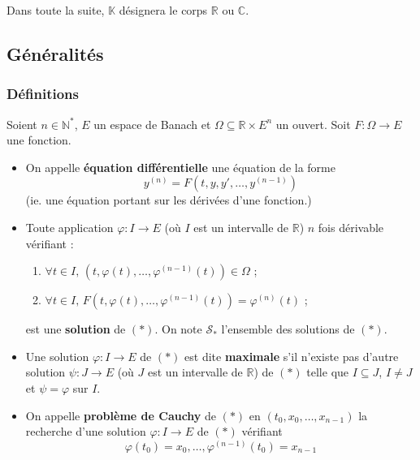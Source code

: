 




  Dans toute la suite, $\mathbb{K}$ désignera le corps $\mathbb{R}$ ou $\mathbb{C}$.

  \subsection{Généralités}

  \subsubsection{Définitions}


  \begin{definition}
    Soient $n \in \mathbb{N}^*$, $E$ un espace de Banach et $\Omega \subseteq \mathbb{R} \times E^n$ un ouvert. Soit $F : \Omega \rightarrow E$ une fonction.
    \begin{itemize}
      \item On appelle \textbf{équation différentielle} une équation de la forme
      \[ y^{(n)} = F(t, y, y', \dots, y^{(n-1)}) \tag{$*$} \]
      (ie. une équation portant sur les dérivées d'une fonction.)
      \item Toute application $\varphi : I \rightarrow E$ (où $I$ est un intervalle de $\mathbb{R}$) $n$ fois dérivable vérifiant :
      \begin{enumerate}[label={\bfseries(\roman*)}]
        \item $\forall t \in I, \, (t, \varphi(t), \dots, \varphi^{(n-1)}(t)) \in \Omega$ ;
        \item $\forall t \in I, \, F(t, \varphi(t), \dots, \varphi^{(n-1)}(t)) = \varphi^{(n)}(t)$ ;
      \end{enumerate}
      est une \textbf{solution} de $(*)$. On note $\mathcal{S}_*$ l'ensemble des solutions de $(*)$.
      \item Une solution $\varphi : I \rightarrow E$ de $(*)$ est dite \textbf{maximale} s'il n'existe pas d'autre solution $\psi : J \rightarrow E$ (où $J$ est un intervalle de $\mathbb{R}$) de $(*)$ telle que $I \subseteq J$, $I \neq J$ et $\psi = \varphi$ sur $I$.
      \item On appelle \textbf{problème de Cauchy} de $(*)$ en $(t_0, x_0, \dots, x_{n-1})$ la recherche d'une solution $\varphi : I \rightarrow E$ de $(*)$ vérifiant
      \[ \varphi(t_0) = x_0, \dots, \varphi^{(n-1)}(t_0) = x_{n-1} \]
    \end{itemize}
  \end{definition}

